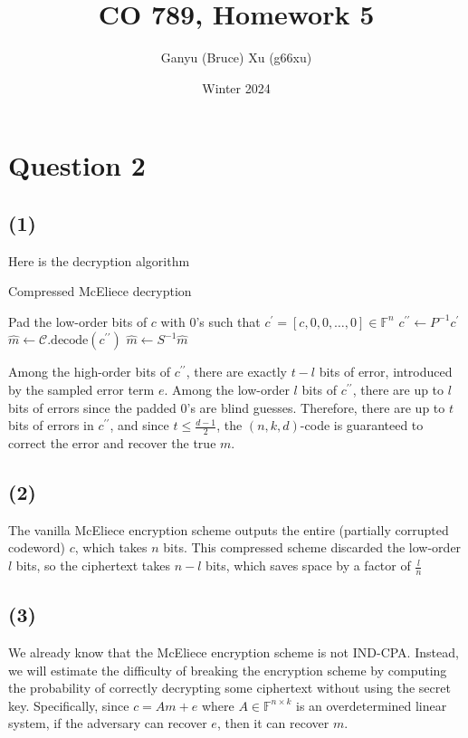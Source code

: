 \documentclass{article}
\title{CO 789, Homework 5}
\author{Ganyu (Bruce) Xu (g66xu)}
\date{Winter 2024}
\begin{document}

\section*{Question 2}

\subsection*{(1)}
Here is the decryption algorithm

\begin{algorithm}
    \caption{Compressed McEliece decryption}

    Pad the low-order bits of $c$ with 0's such that $
        c^\prime = [c, 0, 0, \ldots, 0] \in \mathbb{F}^n
    $\;
    $c^{\prime\prime} \leftarrow P^{-1}c^\prime$\;
    $\hat{m} \leftarrow \mathcal{C}.\text{decode}(c^{\prime\prime})$\;
    $\hat{m} \leftarrow S^{-1}\hat{m}$\;
    \;
\end{algorithm}

Among the high-order bits of $c^{\prime\prime}$, there are exactly $t - l$ bits of error, introduced by the sampled error term $e$. Among the low-order $l$ bits of $c^{\prime\prime}$, there are up to $l$ bits of errors since the padded 0's are blind guesses. Therefore, there are up to $t$ bits of errors in $c^{\prime\prime}$, and since $t \leq \frac{d-1}{2}$, the $(n, k, d)$-code is guaranteed to correct the error and recover the true $m$.

\subsection*{(2)}
The vanilla McEliece encryption scheme outputs the entire (partially corrupted codeword) $c$, which takes $n$ bits. This compressed scheme discarded the low-order $l$ bits, so the ciphertext takes $n - l$ bits, which saves space by a factor of $\frac{l}{n}$

\subsection*{(3)}
We already know that the McEliece encryption scheme is not IND-CPA. Instead, we will estimate the difficulty of breaking the encryption scheme by computing the probability of correctly decrypting some ciphertext without using the secret key. Specifically, since $c = Am + e$ where $A \in \mathbb{F}^{n \times k}$ is an overdetermined linear system, if the adversary can recover $e$, then it can recover $m$.
\end{document}
